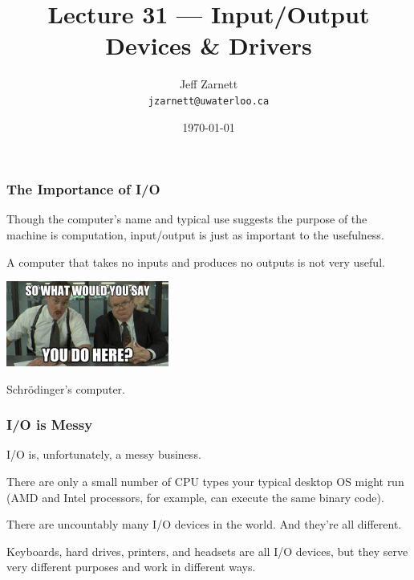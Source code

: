 

\title{Lecture 31 --- Input/Output Devices \& Drivers }

\author{Jeff Zarnett \\ \small \texttt{jzarnett@uwaterloo.ca}}
\date{\today}




\begin{frame}
  \titlepage

 \end{frame}




\begin{frame}
\frametitle{The Importance of I/O}

Though the computer's name and typical use suggests the purpose of the machine is computation, input/output is just as important to the usefulness. 

A computer that takes no inputs and produces no outputs is not very useful.

\begin{center}
	\includegraphics[width=0.4\textwidth]{images/whatyoudohere.jpg}
\end{center}

Schr\"odinger's computer.


\end{frame}

\begin{frame}
\frametitle{I/O is Messy}

I/O is, unfortunately, a messy business. 

There are only a small number of CPU types your typical desktop OS might run (AMD and Intel processors, for example, can execute the same binary code).

There are uncountably many I/O devices in the world. And they're all different. 

Keyboards, hard drives, printers, and headsets are all I/O devices, but they serve very different purposes and work in different ways.


\end{frame}

